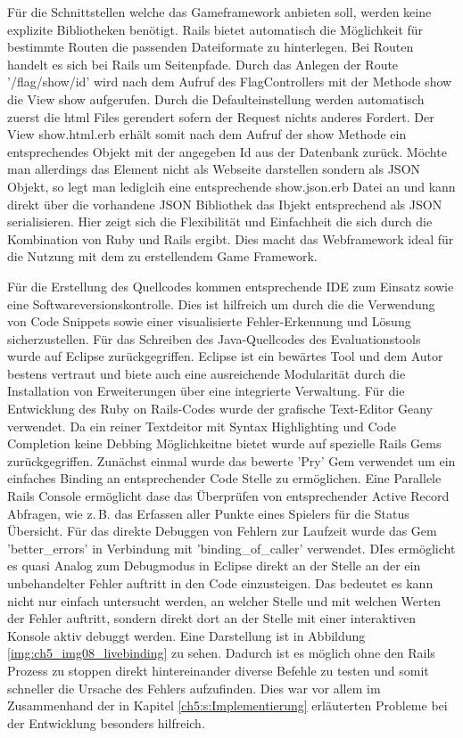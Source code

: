 Für die Schnittstellen welche das Gameframework anbieten soll, werden keine explizite Bibliotheken benötigt. Rails bietet automatisch die Möglichkeit für bestimmte Routen die passenden Dateiformate zu hinterlegen. Bei Routen handelt es sich bei Rails um Seitenpfade. Durch das Anlegen der Route '/flag/show/{id}' wird nach dem Aufruf des FlagControllers mit der Methode show die View show aufgerufen. Durch die Defaulteinstellung werden automatisch zuerst die html Files gerendert sofern der Request nichts anderes Fordert. Der View show.html.erb erhält somit nach dem Aufruf der show Methode ein entsprechendes Objekt mit der angegeben Id aus der Datenbank zurück. Möchte man allerdings das Element nicht als Webseite darstellen sondern als JSON Objekt, so legt man lediglcih eine entsprechende show.json.erb Datei an und kann direkt über die vorhandene JSON Bibliothek das Ibjekt entsprechend als JSON serialisieren.
Hier zeigt sich die Flexibilität und Einfachheit die sich durch die Kombination von Ruby und Rails ergibt. Dies macht das Webframework ideal für die Nutzung mit dem zu erstellendem Game Framework.

Für die Erstellung des Quellcodes kommen entsprechende IDE zum Einsatz sowie eine Softwareversionskontrolle. Dies ist hilfreich um durch die die Verwendung von Code Snippets sowie einer visualisierte Fehler-Erkennung und Lösung sicherzustellen.
Für das Schreiben des Java-Quellcodes des Evaluationstools wurde auf Eclipse zurückgegriffen. Eclipse ist ein bewärtes Tool und dem Autor bestens vertraut und  biete auch eine ausreichende Modularität durch die Installation von Erweiterungen über eine integrierte Verwaltung.
Für die Entwicklung des Ruby on Rails-Codes wurde der grafische Text-Editor Geany verwendet. Da ein reiner Textdeitor mit Syntax Highlighting und Code Completion keine Debbing Möglichkeitne bietet wurde auf spezielle Rails Gems zurückgegriffen.
Zunächst einmal wurde das bewerte 'Pry' Gem verwendet um ein einfaches Binding an entsprechender Code Stelle zu ermöglichen. Eine Parallele Rails Console ermöglicht dase das Überprüfen von entsprechender Active Record Abfragen, wie z.\,B. das Erfassen aller Punkte eines Spielers für die Status Übersicht. Für das direkte Debuggen von Fehlern zur Laufzeit  wurde das Gem 'better\_errors' in Verbindung mit 'binding\_of\_caller' verwendet. DIes ermöglicht es quasi Analog zum Debugmodus in Eclipse direkt an der Stelle an der ein unbehandelter Fehler auftritt in den Code einzusteigen. Das bedeutet es kann nicht nur einfach untersucht werden, an welcher Stelle und mit welchen Werten der Fehler auftritt, sondern direkt dort an der Stelle mit einer interaktiven Konsole aktiv debuggt werden. Eine Darstellung ist in Abbildung \ref{img:ch5_img08_livebinding} zu sehen. Dadurch ist es möglich ohne den Rails Prozess zu stoppen direkt hintereinander diverse Befehle zu testen und somit schneller die Ursache des Fehlers aufzufinden. Dies war vor allem im Zusammenhand der in Kapitel \ref{ch5:s:Implementierung} erläuterten Probleme bei der Entwicklung besonders hilfreich.

